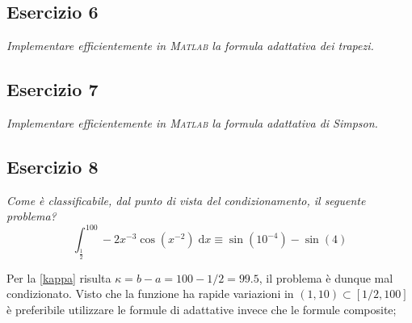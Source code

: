 \subsection{Esercizio 6}
\label{sub:es6}
\emph{Implementare efficientemente in \textsc{Matlab} la formula adattativa dei trapezi.}
\begin{sol}
	
\end{sol}

\subsection{Esercizio 7}
\label{sub:es7}
\emph{Implementare efficientemente in \textsc{Matlab} la formula adattativa di Simpson.}
\begin{sol}
	
\end{sol}


\subsection{Esercizio 8}
\label{sub:es8}
\emph{Come è classificabile, dal punto di vista del condizionamento, il seguente problema?
			$$\int_{\frac{1}{2}}^{100}-2x^{-3}\cos\left(x^{-2}\right)\;\mathrm{d}x\equiv\sin\left(10^{-4}\right)-\sin(4)$$}
\begin{sol}
	
	\normalfont
	Per la \ref{kappa} risulta $\kappa=b-a=100-1/2=99.5$, il problema è dunque mal condizionato.
	Visto che la funzione ha rapide variazioni in $(1,10)\subset[1/2,100]$ è preferibile
	utilizzare le formule di adattative invece che le formule composite;
\end{sol}

